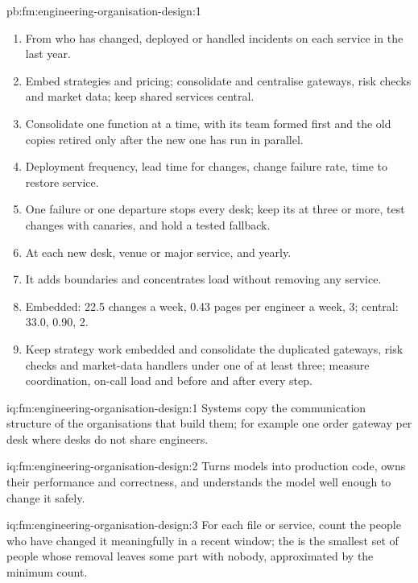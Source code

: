 \begin{solution}{pb:fm:engineering-organisation-design:1}
\begin{enumerate}
\item From who has changed, deployed or handled incidents on each service in the last year.
\item Embed strategies and pricing; consolidate and centralise gateways, risk checks and market data; keep shared services central.
\item Consolidate one function at a time, with its team formed first and the old copies retired only after the new one has run in parallel.
\item Deployment frequency, lead time for changes, change failure rate, time to restore service.
\item One failure or one departure stops every desk; keep its  at three or more, test changes with canaries, and hold a tested fallback.
\item At each new desk, venue or major service, and yearly.
\item It adds boundaries and concentrates load without removing any service.
\item Embedded: 22.5 changes a week, 0.43 pages per engineer a week,  3; central: 33.0, 0.90, 2.
\item Keep strategy work embedded and consolidate the duplicated gateways, risk checks and market-data handlers under one  of at least
three; measure coordination, on-call load and  before and after every step.
\end{enumerate}
\end{solution}

\begin{solution}{iq:fm:engineering-organisation-design:1}
Systems copy the communication structure of the organisations that build them; for example one order gateway per desk where desks do not share
engineers.
\end{solution}

\begin{solution}{iq:fm:engineering-organisation-design:2}
Turns models into production code, owns their performance and correctness, and understands the model well enough to change it safely.
\end{solution}

\begin{solution}{iq:fm:engineering-organisation-design:3}
For each file or service, count the people who have changed it meaningfully in a recent window; the  is the smallest set of people whose
removal leaves some part with nobody, approximated by the minimum count.
\end{solution}

